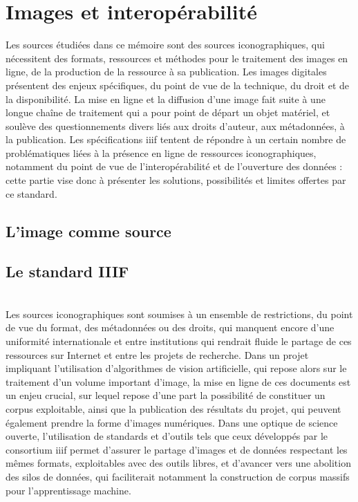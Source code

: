 \documentclass[a4paper,12pt,twoside]{book}
\newcommand{\iiif}{\gls{iiif}\xspace}
\newcommand{\clearemptydoublepage}{\newpage{\pagestyle{empty}\cleardoublepage}}
\begin{document}
        \chapter{Images et interopérabilité}
        Les sources étudiées dans ce mémoire sont des sources iconographiques, qui nécessitent des formats, ressources et méthodes pour le traitement des images en ligne, de la production de la ressource à sa publication. Les images digitales présentent des enjeux spécifiques, du point de vue de la technique, du droit et de la disponibilité. La mise en ligne et la diffusion d'une image fait suite à une longue chaîne de traitement qui a pour point de départ un objet matériel, et soulève des questionnements divers liés aux droits d'auteur, aux métadonnées, à la publication. Les spécifications \iiif tentent de répondre à un certain nombre de problématiques liées à la présence en ligne de ressources iconographiques, notamment du point de vue de l'interopérabilité et de l'ouverture des données : cette partie vise donc à présenter les solutions, possibilités et limites offertes par ce standard.
        
            \section{L’image comme source}
                
        
            \section{\label{stardardIiif}Le standard IIIF}
                
        	\\
        
        Les sources iconographiques sont soumises à un ensemble de restrictions, du point de vue du format, des métadonnées ou des droits, qui manquent encore d'une uniformité internationale et entre institutions qui rendrait fluide le partage de ces ressources sur Internet et entre les projets de recherche. Dans un projet impliquant l'utilisation d'algorithmes de vision artificielle, qui repose alors sur le traitement d'un volume important d'image, la mise en ligne de ces documents est un enjeu crucial, sur lequel repose d'une part la possibilité de constituer un corpus exploitable, ainsi que la publication des résultats du projet, qui peuvent également prendre la forme d'images numériques. Dans une optique de science ouverte, l'utilisation de standards et d'outils tels que ceux développés par le consortium \iiif permet d'assurer le partage d'images et de données respectant les mêmes formats, exploitables avec des outils libres, et d'avancer vers une abolition des silos de données, qui faciliterait notamment la construction de corpus massifs pour l'apprentissage machine. 
        \clearemptydoublepage
        
\end{document}
